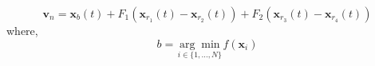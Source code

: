 $$\mathbf{v}_{n}=\mathbf{x}_{b}(t)
+F_{1}\left(\mathbf{x}_{r_{1}}(t)-\mathbf{x}_{r_{2}}(t)\right)
+F_{2}\left(\mathbf{x}_{r_{3}}(t)-\mathbf{x}_{r_{4}}(t)\right)$$
where,
$$
b=\underset{i \in\{1, \ldots, N\}}{\arg \min } f\left(\mathbf{x}_{i}\right)
$$